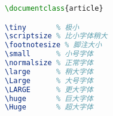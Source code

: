 \begin{lstlisting}[language=TeX]
\documentclass{article}

\tiny       % 极小
\scriptsize % 比小字体稍大
\footnotesize % 脚注大小
\small      % 小号字体
\normalsize % 正常字体
\large      % 稍大字体
\Large      % 大号字体
\LARGE      % 更大字体
\huge       % 巨大字体
\Huge       % 超大字体

\end{lstlisting}

